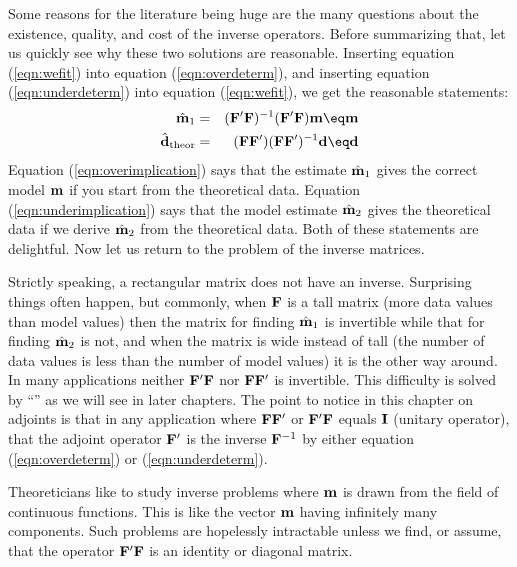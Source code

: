 Some reasons for the literature being huge are the
many questions
about the existence, quality, and cost
of the inverse operators.
Before summarizing that,
let us quickly see why these two solutions are reasonable.
Inserting equation
(\ref{eqn:wefit})
into equation
(\ref{eqn:overdeterm}),
and inserting equation
(\ref{eqn:underdeterm})
into equation
(\ref{eqn:wefit}),
we get the reasonable statements:
\begin{eqnarray}
\hat {\bold m}_1 &=& (\bold F'\bold F)^{-1}(\bold F'\bold F)\bold m \eq\bold m
                                                \label{eqn:overimplication} \\
\hat {\bold d}_{\rm theor} &=&
                     (\bold F\bold F')(\bold F\bold F')^{-1}\bold d \eq\bold d
                                                \label{eqn:underimplication}
\end{eqnarray}
Equation (\ref{eqn:overimplication}) says that the estimate $\hat {\bold m}_1$
gives the correct model $\bold m$
if you start from the theoretical data.
Equation (\ref{eqn:underimplication}) says that the model estimate $\hat {\bold m}_2$
gives the theoretical data if we derive $\hat{\bold m}_2$
from the theoretical data.
Both of these statements are delightful.
Now let us return to the problem of the inverse matrices.

\par
Strictly speaking, a rectangular matrix does not have an inverse.
Surprising things often happen, but commonly,
when $\bold F$ is a tall matrix 
(more data values than model values)
then the matrix for finding
$\hat{\bold m}_1$
is invertible while that for finding
$\hat{\bold m}_2$
is not,
and when the matrix is wide instead of tall
(the number of data values is less than the number of model values)
it is the other way around.
In many applications neither
$\bold F'\bold F$ nor
$\bold F\bold F'$ 
is invertible.  This difficulty is
solved by ``'' as we will see in later chapters.
The point to notice in this chapter on adjoints
is that in any application where
$\bold F \bold F'$
or
$\bold F' \bold F$ equals $\bold I$ (unitary operator),
that the adjoint operator $\bold F'$ is the inverse $\bold F^{-1}$
by either equation (\ref{eqn:overdeterm}) or (\ref{eqn:underdeterm}).
\par
Theoreticians like to study inverse problems where $\bold m$
is drawn from the field of continuous functions.
This is like the vector $\bold m$ having infinitely many components.
Such problems are hopelessly intractable unless we find,
or assume, that the operator
$\bold F' \bold F$
is an identity or diagonal matrix.

